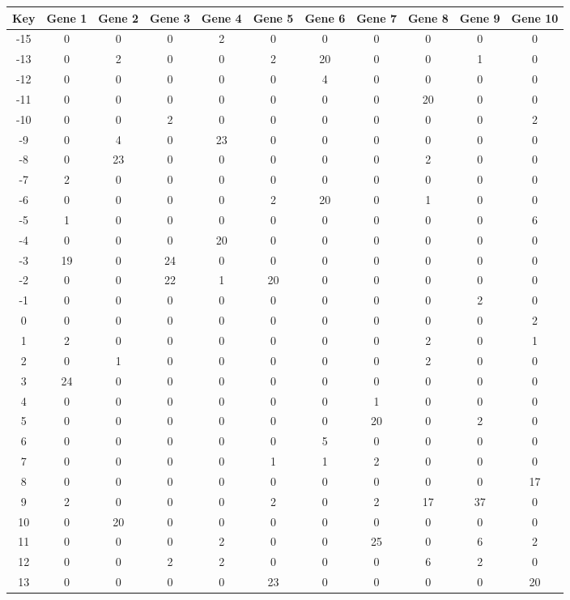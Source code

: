 \begin{tabular}{|c|c|c|c|c|c|c|c|c|c|c|}
\hline
Key & Gene 1 & Gene 2 & Gene 3 & Gene 4 & Gene 5 & Gene 6 & Gene 7 & Gene 8 & Gene 9 & Gene 10 \\
\hline
-15 & 0 & 0 & 0 & 2 & 0 & 0 & 0 & 0 & 0 & 0 \\
-13 & 0 & 2 & 0 & 0 & 2 & 20 & 0 & 0 & 1 & 0 \\
-12 & 0 & 0 & 0 & 0 & 0 & 4 & 0 & 0 & 0 & 0 \\
-11 & 0 & 0 & 0 & 0 & 0 & 0 & 0 & 20 & 0 & 0 \\
-10 & 0 & 0 & 2 & 0 & 0 & 0 & 0 & 0 & 0 & 2 \\
-9 & 0 & 4 & 0 & 23 & 0 & 0 & 0 & 0 & 0 & 0 \\
-8 & 0 & 23 & 0 & 0 & 0 & 0 & 0 & 2 & 0 & 0 \\
-7 & 2 & 0 & 0 & 0 & 0 & 0 & 0 & 0 & 0 & 0 \\
-6 & 0 & 0 & 0 & 0 & 2 & 20 & 0 & 1 & 0 & 0 \\
-5 & 1 & 0 & 0 & 0 & 0 & 0 & 0 & 0 & 0 & 6 \\
-4 & 0 & 0 & 0 & 20 & 0 & 0 & 0 & 0 & 0 & 0 \\
-3 & 19 & 0 & 24 & 0 & 0 & 0 & 0 & 0 & 0 & 0 \\
-2 & 0 & 0 & 22 & 1 & 20 & 0 & 0 & 0 & 0 & 0 \\
-1 & 0 & 0 & 0 & 0 & 0 & 0 & 0 & 0 & 2 & 0 \\
0 & 0 & 0 & 0 & 0 & 0 & 0 & 0 & 0 & 0 & 2 \\
1 & 2 & 0 & 0 & 0 & 0 & 0 & 0 & 2 & 0 & 1 \\
2 & 0 & 1 & 0 & 0 & 0 & 0 & 0 & 2 & 0 & 0 \\
3 & 24 & 0 & 0 & 0 & 0 & 0 & 0 & 0 & 0 & 0 \\
4 & 0 & 0 & 0 & 0 & 0 & 0 & 1 & 0 & 0 & 0 \\
5 & 0 & 0 & 0 & 0 & 0 & 0 & 20 & 0 & 2 & 0 \\
6 & 0 & 0 & 0 & 0 & 0 & 5 & 0 & 0 & 0 & 0 \\
7 & 0 & 0 & 0 & 0 & 1 & 1 & 2 & 0 & 0 & 0 \\
8 & 0 & 0 & 0 & 0 & 0 & 0 & 0 & 0 & 0 & 17 \\
9 & 2 & 0 & 0 & 0 & 2 & 0 & 2 & 17 & 37 & 0 \\
10 & 0 & 20 & 0 & 0 & 0 & 0 & 0 & 0 & 0 & 0 \\
11 & 0 & 0 & 0 & 2 & 0 & 0 & 25 & 0 & 6 & 2 \\
12 & 0 & 0 & 2 & 2 & 0 & 0 & 0 & 6 & 2 & 0 \\
13 & 0 & 0 & 0 & 0 & 23 & 0 & 0 & 0 & 0 & 20 \\
\hline
\end{tabular}